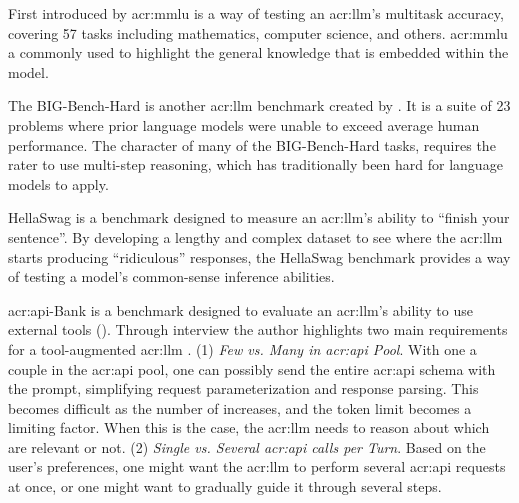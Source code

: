 First introduced by \cite{hendrycksMeasuringMassiveMultitask2021} \gls{acr:mmlu} is a way of testing an \acrlong{acr:llm}'s multitask accuracy, covering 57 tasks including mathematics, computer science, and others. \gls{acr:mmlu} a commonly used to highlight the general knowledge that is embedded within the model.

The BIG-Bench-Hard is another \acrshort{acr:llm} benchmark created by \cite{suzgunChallengingBIGBenchTasks2022}. It is a suite of 23 problems where prior language models were unable to exceed average human performance. The character of many of the BIG-Bench-Hard tasks, requires the rater to use multi-step reasoning, which has traditionally been hard for language models to apply.

HellaSwag \citep{zellersHellaSwagCanMachine2019} is a benchmark designed to measure an \acrshort{acr:llm}'s ability to \enquote{finish your sentence}. By developing a lengthy and complex dataset to see where the \acrshort{acr:llm} starts producing \enquote{ridiculous} responses, the HellaSwag benchmark provides a way of testing a model's common-sense inference abilities.

\acrshort{acr:api}-Bank \citep{liAPIBankComprehensiveBenchmark2023} is a benchmark designed to evaluate an \acrshort{acr:llm}'s ability to use external tools (). Through interview the author highlights two main requirements for a tool-augmented \acrshort{acr:llm} \citep[2]{liAPIBankComprehensiveBenchmark2023}. (1) \textit{Few vs. Many  in \acrshort{acr:api} Pool}. With one a couple  in the \acrshort{acr:api} pool, one can possibly send the entire \acrshort{acr:api} schema with the prompt, simplifying request parameterization and response parsing. This becomes difficult as the number of  increases, and the token limit becomes a limiting factor. When this is the case, the \acrshort{acr:llm} needs to reason about which  are relevant or not. (2) \textit{Single vs. Several \acrshort{acr:api} calls per Turn}. Based on the user's preferences, one might want the \acrshort{acr:llm} to perform several \acrshort{acr:api} requests at once, or one might want to gradually guide it through several steps.



\glsresetall